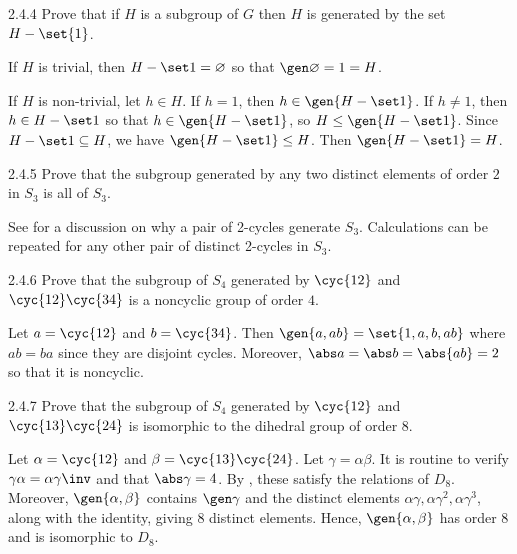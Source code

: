 \begin{exercise}{2.4.4}
    Prove that if $H$ is a subgroup of $G$ then $H$ is generated by the set $H - \set{1}$.
\end{exercise}

\begin{sol}
    If $H$ is trivial, then $H - \set 1 = \varnothing$ so that $\gen\varnothing = 1 = H$.

    If $H$ is non-trivial, let $h \in H$.
	If $h = 1$, then $h \in \gen{H - \set 1}$.
	If $h \neq 1$, then $h \in H - \set 1$ so that $h \in \gen{H - \set 1}$, so $H \leq \gen{H - \set 1}$.
	Since $H - \set 1 \subseteq H$, we have $\gen{H - \set 1} \leq H$.
	Then $\gen{H - \set 1} = H$.
\end{sol}

\begin{exercise}{2.4.5}
    Prove that the subgroup generated by any two distinct elements of order $2$ in $S_3$ is all of $S_3$.
\end{exercise}

\begin{sol}
    See  for a discussion on why a pair of 2-cycles generate $S_3$.
	Calculations can be repeated for any other pair of distinct 2-cycles in $S_3$.
\end{sol}

\begin{exercise}{2.4.6}
    Prove that the subgroup of $S_4$ generated by $\cyc{1 2}$ and $\cyc{1 2}\cyc{3 4}$ is a noncyclic group of order $4$.
\end{exercise}

\begin{sol}
    Let $a = \cyc{1 2}$ and $b = \cyc{3 4}$.
	Then $\gen{a, ab} = \set{1, a, b, ab}$ where $ab = ba$ since they are disjoint cycles.
	Moreover, $\abs a = \abs b = \abs{ab} = 2$ so that it is noncyclic.
\end{sol}

\begin{exercise}{2.4.7}
    Prove that the subgroup of $S_4$ generated by $\cyc{1 2}$ and $\cyc{1 3}\cyc{2 4}$ is isomorphic to the dihedral group of order $8$.
\end{exercise}

\begin{sol}
    Let $\alpha = \cyc{1 2}$ and $\beta = \cyc{1 3}\cyc{2 4}$.
	Let $\gamma = \alpha\beta$.
	It is routine to verify $\gamma\alpha = \alpha\gamma\inv$ and that $\abs\gamma = 4$.
	By , these satisfy the relations of $D_8$.
	Moreover, $\gen{\alpha, \beta}$ contains $\gen\gamma$ and the distinct elements $\alpha\gamma, \alpha\gamma^2, \alpha\gamma^3$, along with the identity, giving 8 distinct elements.
	Hence, $\gen{\alpha, \beta}$ has order 8 and is isomorphic to $D_8$.
\end{sol}

